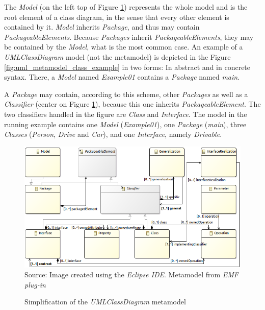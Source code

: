 \documentclass[tuberlin,cic,tc,english,noabntcite, oneside]{iiufrgs}
\begin{document}
The \emph{Model} (on the left top of Figure \ref{fig:uml_metamodel_class}) represents the whole model and is the root element of a class diagram, in the sense that every other element is contained by it. \emph{Model} inherits \emph{Package}, and thus may contain \emph{PackageableElements}. Because \emph{Packages} inherit \emph{PackageableElements}, they may be contained by the \emph{Model}, what is the most common case. An example of a \emph{UMLClassDiagram} model (not the metamodel) is depicted in the Figure \ref{fig:uml_metamodel_class_example} in two forms: In abstract and in concrete syntax. There, a \emph{Model} named \emph{Example01} contains a \emph{Package} named \emph{main}.

A \emph{Package} may contain, according to this scheme, other \emph{Packages} as well as a \emph{Classifier} (center on Figure \ref{fig:uml_metamodel_class}), because this one inherits \emph{PackageableElement}. The two classifiers handled in the figure are \emph{Class} and \emph{Interface}. The model in the running example contains one \emph{Model} (\emph{Example01}), one \emph{Package} (\emph{main}), three \emph{Classes} (\emph{Person}, \emph{Drive} and \emph{Car}), and one \emph{Interface}, namely \emph{Drivable}.

\begin{figure}[H]
	\centering
    \caption{Simplification of the \emph{UMLClassDiagram} metamodel}
    \includegraphics[width=\textwidth]{umlClassDiagramSimple01} \\
    Source: Image created using the \emph{Eclipse IDE}. Metamodel from \emph{EMF plug-in}
    \label{fig:uml_metamodel_class}
\end{figure}
\end{document}
